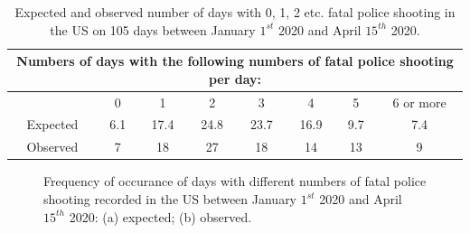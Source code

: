 \documentclass[a4paper]{article}
\begin{document}
    \begin{table}[H]
    \centering
    \begin{tabular}{cccccccc}
    \hline
    \multicolumn{8}{c}{Numbers of days with the following numbers of fatal police shooting per day:}\\
    \hline
    \hline
    &0&1&2&3&4&5&6 or more\\
    \hline
    Expected&6.1&17.4&24.8&23.7&16.9&9.7&7.4\\
    \hline
    Observed&7&18&27&18&14&13&9\\
	\hline
    \end{tabular}
    \caption{Expected and observed number of days with 0, 1, 2 etc. fatal police shooting in the US on 105 days between January $1^{st}$ 2020 and April $15^{th}$ 2020.}
    \end{table}
    
    \begin{figure}[H]
    \centering
	\caption{Frequency of occurance of days with different numbers of fatal police shooting recorded in the US between January $1^{st}$ 2020 and April $15^{th}$ 2020: (a) expected; (b) observed.}
    \end{figure}
    
\end{document}
